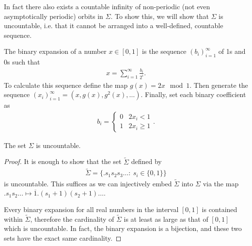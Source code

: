 In fact there also exists a countable infinity of non-periodic (not even asymptotically periodic) orbits in $\Sigma$. To show this, we will show that $\Sigma$ is uncountable, i.e. that it cannot be arranged into a well-defined, countable sequence.
\begin{definition}
	The binary expansion of a number $x\in [0,1]$ is the sequence $(b_i)_{i=1}^{\infty }$ of 1s and 0s  such that 
	\begin{align}
		x = \sum_{i=1}^{\infty } \frac{b_i}{2^i}.
	\end{align}
	To calculate this sequence define the map $g(x) = 2x \mod 1$. Then generate the sequence $(x_i)_{i=1}^{\infty }=(x, g(x), g^2(x), \ldots)$. Finally, set each binary coefficient as
	 \begin{align}
		b_i =
		\begin{cases}
			0 & 2x_i < 1 \\
			1 & 2x_i \geq 1
		\end{cases}.
	\end{align}
	
\end{definition}
\begin{proposition}[]
	The set $\Sigma$ is uncountable.
\end{proposition}
\begin{proof}
	It is enough to show that the set $\tilde{\Sigma}$ defined by 
	 \begin{align}
		 \tilde{\Sigma} = \{ \bm{.} s_1s_2s_3 \ldots:\ s_i\in \{0,1\}\}
	\end{align}
	is uncountable. This suffices as we can injectively embed $\tilde{\Sigma}$ into $\Sigma$ via the map $\bm{.} s_1s_2\ldots \mapsto \overline{1}\bm{.} (s_1+1)(s_2+1)\ldots$.

	Every binary expansion for all real numbers in the interval $[0,1]$ is contained within $\tilde{\Sigma}$, therefore the cardinality of $\tilde{\Sigma}$ is at least as large as that of $[0,1]$ which is uncountable. In fact, the binary expansion is a bijection, and these two sets have the exact same cardinality. 
\end{proof}

